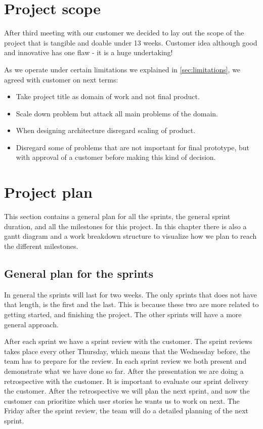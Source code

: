 \section{Project scope}
After third meeting with our customer we decided to lay out the scope of the project that is tangible and doable under 13 weeks. Customer idea although good and innovative has one flaw - it is a huge undertaking!

As we operate under certain limitations we explained in \ref{sec:limitations}, we agreed with customer on next terms:
\begin{itemize}
	\item Take project title as domain of work and not final product.
	\item Scale down problem but attack all main problems of the domain.
	\item When designing architecture disregard scaling of product.
	\item Disregard some of problems that are not important for final prototype, but  with approval of a customer before making this kind of decision.
\end{itemize}

\section{Project plan}
This section contains a general plan for all the sprints, the general sprint duration, and all the milestones for this project. In this chapter there is also a gantt diagram and a work breakdown structure to visualize how we plan to reach the different milestones.

\subsection{General plan for the sprints}

In general the sprints will last for two weeks. The only sprints that does not have that length, is the first and the last. This is because these two are more related to getting started, and finishing the project. The other sprints will have a more general approach. 

After each sprint we have a sprint review with the customer. The sprint reviews takes place every other Thursday, which means that the Wednesday before, the team has to prepare for the review. In each sprint review we both present and demonstrate what we have done so far. After the presentation we are doing a retrospective with the customer. It is important to evaluate our sprint delivery the customer. After the retrospective we will plan the next sprint, and now the customer can prioritize which user stories he wants us to work on next. The Friday after the sprint review, the team will do a detailed planning of the next sprint. 

